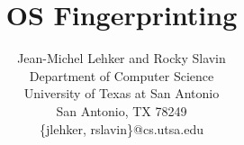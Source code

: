 \documentclass[11pt]{article}
\begin{document}
\title{OS Fingerprinting}

\author{Jean-Michel Lehker and Rocky Slavin\\
        Department of Computer Science\\
        University of Texas at San Antonio\\
        San Antonio, TX 78249\\
        \{jlehker, rslavin\}@cs.utsa.edu}

\date{ }
\maketitle 













 



\end{document}
